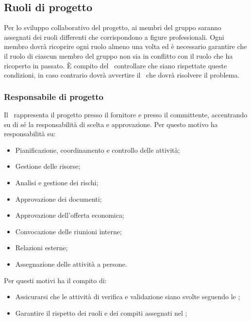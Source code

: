 \documentclass[../NormeProgetto.tex]{subfiles}
\begin{document}
	\subsection{Ruoli di progetto}
	Per lo sviluppo collaborativo del progetto, ai membri del gruppo saranno assegnati dei ruoli differenti che corrispondono a figure professionali. Ogni membro dovrà ricoprire ogni ruolo almeno una volta ed è necessario garantire che il ruolo di ciascun membro del gruppo non sia in conflitto con il ruolo che ha ricoperto in passato. È compito del \verificatore\ controllare che siano rispettate queste condizioni, in caso contrario dovrà avvertire il \responsabilediprogetto\ che dovrà risolvere il problema.
		\subsubsection{Responsabile di progetto}
		Il \responsabilediprogetto\ rappresenta il progetto presso il fornitore e presso il committente, accentrando su di sé la responsabilità di scelta e approvazione. Per questo motivo ha responsabilità su:
		\begin{itemize}
		\item Pianificazione, coordinamento e controllo delle attività;
		\item Gestione delle risorse;
		\item Analisi e gestione dei rischi;
		\item Approvazione dei documenti;
		\item Approvazione dell'offerta economica;
		\item Convocazione delle riunioni interne;
		\item Relazioni esterne;
		\item Assegnazione delle attività a persone.
		\end{itemize}
		Per questi motivi ha il compito di:
		\begin{itemize}
		\item Assicurarsi che le attività di verifica e validazione siano svolte seguendo le \normediprogetto;
		\item Garantire il rispetto dei ruoli e dei compiti assegnati nel \pianodiprogetto;
		\end{itemize}
\end{document}

